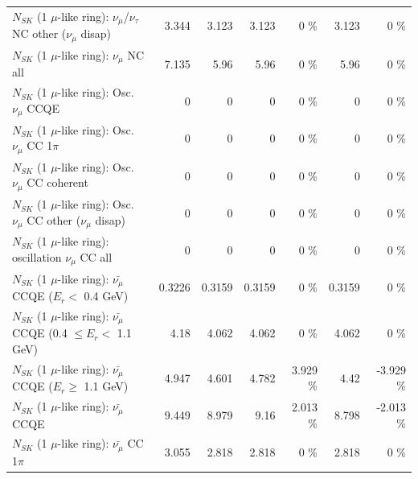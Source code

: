 \begin{table}
\begin{tabular}{| l | r | r | r  r | r  r |}
   $N_{SK}$ (1 $\mu$-like ring): $\nu_\mu$/$\nu_\tau$ NC other ($\nu_\mu$ disap) &           3.344 &           3.123 &           3.123 &        0 \%  &           3.123 &        0 \%  \\ 
                                $N_{SK}$ (1 $\mu$-like ring): $\nu_{\mu}$ NC all &           7.135 &            5.96 &            5.96 &        0 \%  &            5.96 &        0 \%  \\ 
\hline
\hline
                               $N_{SK}$ (1 $\mu$-like ring): Osc. $\nu_\mu$ CCQE &               0 &               0 &               0 &        0 \%  &               0 &        0 \%  \\ 
                          $N_{SK}$ (1 $\mu$-like ring): Osc. $\nu_\mu$ CC 1$\pi$ &               0 &               0 &               0 &        0 \%  &               0 &        0 \%  \\ 
                        $N_{SK}$ (1 $\mu$-like ring): Osc. $\nu_\mu$ CC coherent &               0 &               0 &               0 &        0 \%  &               0 &        0 \%  \\ 
         $N_{SK}$ (1 $\mu$-like ring): Osc. $\nu_\mu$ CC other ($\nu_\mu$ disap) &               0 &               0 &               0 &        0 \%  &               0 &        0 \%  \\ 
                      $N_{SK}$ (1 $\mu$-like ring): oscillation $\nu_\mu$ CC all &               0 &               0 &               0 &        0 \%  &               0 &        0 \%  \\ 
\hline
\hline
          $N_{SK}$ (1 $\mu$-like ring): $\bar{\nu_\mu}$ CCQE ($E_{r} <$ 0.4 GeV) &          0.3226 &          0.3159 &          0.3159 &        0 \%  &          0.3159 &        0 \%  \\ 
 $N_{SK}$ (1 $\mu$-like ring): $\bar{\nu_\mu}$ CCQE (0.4 $\leq E_{r} <$ 1.1 GeV) &            4.18 &           4.062 &           4.062 &        0 \%  &           4.062 &        0 \%  \\ 
       $N_{SK}$ (1 $\mu$-like ring): $\bar{\nu_\mu}$ CCQE ($E_{r} \geq$ 1.1 GeV) &           4.947 &           4.601 &           4.782 &    3.929 \%  &            4.42 &   -3.929 \%  \\ 
\hline
                              $N_{SK}$ (1 $\mu$-like ring): $\bar{\nu_\mu}$ CCQE &           9.449 &           8.979 &            9.16 &    2.013 \%  &           8.798 &   -2.013 \%  \\ 
                         $N_{SK}$ (1 $\mu$-like ring): $\bar{\nu_\mu}$ CC 1$\pi$ &           3.055 &           2.818 &           2.818 &        0 \%  &           2.818 &        0 \%  \\ 

\end{tabular}
\end{table}
